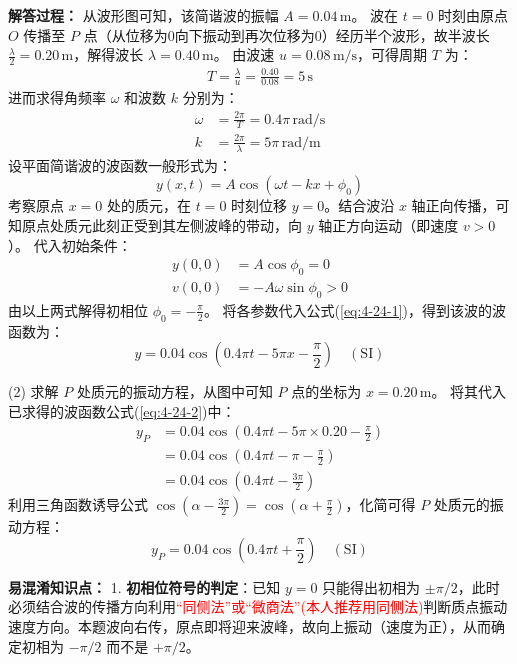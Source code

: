 \textbf{解答过程： }
从波形图可知，该简谐波的振幅 $A = 0.04\,\text{m}$。
波在 $t=0$ 时刻由原点 $O$ 传播至 $P$ 点（从位移为0向下振动到再次位移为0）经历半个波形，故半波长 $\frac{\lambda}{2} = 0.20\,\text{m}$，解得波长 $\lambda = 0.40\,\text{m}$。
由波速 $u = 0.08\,\text{m/s}$，可得周期 $T$ 为：
\begin{align*}
	T = \frac{\lambda}{u} = \frac{0.40}{0.08} = 5\,\text{s}
\end{align*}
进而求得角频率 $\omega$ 和波数 $k$ 分别为：
\begin{align*}
	\omega &= \frac{2\pi}{T} = 0.4\pi\,\text{rad/s} \\
	k &= \frac{2\pi}{\lambda} = 5\pi\,\text{rad/m}
\end{align*}
设平面简谐波的波函数一般形式为：
\begin{equation}\label{eq:4-24-1}
	y(x,t) = A \cos(\omega t - kx + \phi_0)
\end{equation}
考察原点 $x=0$ 处的质元，在 $t=0$ 时刻位移 $y=0$。结合波沿 $x$ 轴正向传播，可知原点处质元此刻正受到其左侧波峰的带动，向 $y$ 轴正方向运动（即速度 $v > 0$）。
代入初始条件：
\begin{align*}
	y(0,0) &= A \cos\phi_0 = 0 \\
	v(0,0) &= -A\omega \sin\phi_0 > 0
\end{align*}
由以上两式解得初相位 $\phi_0 = -\frac{\pi}{2}$。
将各参数代入公式(\ref{eq:4-24-1})，得到该波的波函数为：
\begin{equation}\label{eq:4-24-2}
	y = 0.04 \cos(0.4\pi t - 5\pi x - \frac{\pi}{2}) \quad (\text{SI})
\end{equation}

(2) 求解 $P$ 处质元的振动方程，从图中可知 $P$ 点的坐标为 $x = 0.20\,\text{m}$。
将其代入已求得的波函数公式(\ref{eq:4-24-2})中：
\begin{align*}
	y_P &= 0.04 \cos(0.4\pi t - 5\pi \times 0.20 - \frac{\pi}{2}) \\
	&= 0.04 \cos(0.4\pi t - \pi - \frac{\pi}{2}) \\
	&= 0.04 \cos(0.4\pi t - \frac{3\pi}{2})
\end{align*}
利用三角函数诱导公式 $\cos(\alpha - \frac{3\pi}{2}) = \cos(\alpha + \frac{\pi}{2})$，化简可得 $P$ 处质元的振动方程：
\begin{equation}\label{eq:4-24-3}
	y_P = 0.04 \cos(0.4\pi t + \frac{\pi}{2}) \quad (\text{SI})
\end{equation}

\textbf{易混淆知识点： }
1. \textbf{初相位符号的判定}：已知 $y=0$ 只能得出初相为 $\pm\pi/2$，此时必须结合波的传播方向利用\textcolor{red}{“同侧法”或“微商法”(本人推荐用同侧法)}判断质点振动速度方向。本题波向右传，原点即将迎来波峰，故向上振动（速度为正），从而确定初相为 $-\pi/2$ 而不是 $+\pi/2$。

